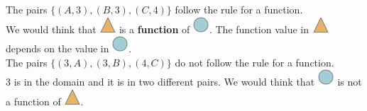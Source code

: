 \documentclass{ximera}
\begin{document}
\begin{example}
The pairs $\{ (A, 3), (B, 3), (C, 4) \}$ follow the rule for a function. \\
We would think that \includegraphics{pics/triangle.png} is a \textbf{function} of \includegraphics{pics/circle.png}. The function value in \includegraphics{pics/triangle.png} depends on the value in \includegraphics{pics/circle.png}. \\


The pairs $\{ (3, A), (3, B), (4, C) \}$ do not follow the rule for a function.  \\
3 is in the domain and it is in two different pairs. We would think that \includegraphics{pics/circle.png} is not a function of \includegraphics{pics/triangle.png}.

\end{example}
\end{document}
